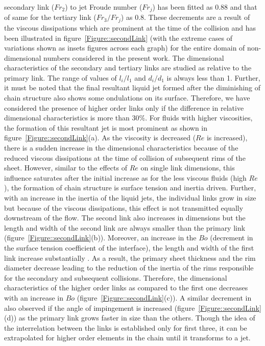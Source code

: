 \documentclass[%
 aip,
 sd,%
amsmath,amssymb,
preprint,%
author-year,%
]{revtex4-1}
\begin{document}
secondary link ($Fr_2$) to jet Froude number ($Fr_j$) has been fitted as 0.88 and that of same for the tertiary link ($Fr_3/Fr_j$) as 0.8. These decrements are a result of the viscous dissipations which are prominent at the time of the collision and has been illustrated in figure~\ref{Figure::secondLink} (with the extreme cases of variations shown as insets figures across each graph) for the entire domain of non-dimensional numbers considered in the present work. The dimensional characteristics of the secondary and tertiary links are studied as relative to the primary link. The range of values of $l_i/l_1$ and $d_i/d_1$ is always less than 1. Further, it must be noted that the final resultant liquid jet formed after the diminishing of chain structure also shows some ondulations on its surface. Therefore, we have considered the presence of higher order links only if the difference in relative dimensional characteristics is more than 30$\%$. For fluids with higher viscosities, the formation of this resultant jet is most prominent as shown in figure~\ref{Figure::secondLink}(a). As the viscosity is decreased ($Re$ is increased), there is a sudden increase in the dimensional characteristics because of the reduced viscous dissipations at the time of collision of subsequent rims of the sheet. However, similar to the effects of $Re$ on single link dimensions, this influence saturates after the initial increase as for the less viscous fluids (high $Re$), the formation of chain structure is surface tension and inertia driven. Further, with an increase in the inertia of the liquid jets, the individual links grow in size but because of the viscous dissipations, this effect is not transmitted equally downstream of the flow. The second link also increases in dimensions but the length and width of the second link are always smaller than the primary link (figure~\ref{Figure::secondLink}(b)). Moreover, an increase in the $Bo$ (decrement in the surface tension coefficient of the interface), the length and width of the first link increase substantially \citep{yang2014liquid,bremond2006atomization}. As a result, the primary sheet thickness and the rim diameter decrease leading to the reduction of the inertia of the rims responsible for the secondary and subsequent collisions. Therefore, the dimensional characteristics of the higher order links as compared to the first one decreases with an increase in $Bo$ (figure~\ref{Figure::secondLink}(c)). A similar decrement in also observed if the angle of impingement is increased (figure~\ref{Figure::secondLink}(d)) as the primary link grows faster in size than the others. Though the idea of the interrelation between the links is established only for first three, it can be extrapolated for higher order elements in the chain until it transforms to a jet.
\end{document}
